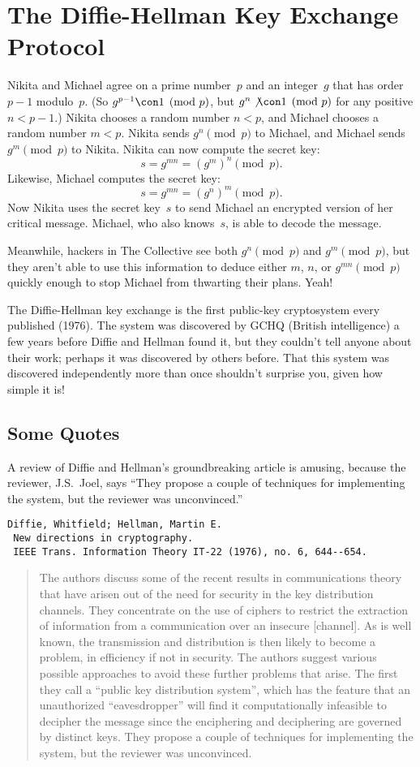 \documentclass[11pt]{report}
\begin{document}
\section{The Diffie-Hellman Key Exchange Protocol}
Nikita and Michael agree on a prime number~$p$ and
an integer~$g$ that has order $p-1$ modulo~$p$.
(So $g^{p-1}\con 1\pmod{p}$, but $g^{n} \not\con 1\pmod{p}$
for any positive $n<p-1$.)  Nikita chooses a random number
$n<p$, and Michael chooses a random number $m<p$.
Nikita sends $g^n\pmod{p}$ to Michael, and Michael
sends $g^m\pmod{p}$ to Nikita.
Nikita can now compute the secret key:
$$
  s = g^{mn} = (g^m)^n \pmod{p}.
$$
Likewise, Michael computes the secret key:
$$
  s = g^{mn} = (g^n)^m \pmod{p}.
$$
Now Nikita uses the secret key~$s$ to send Michael
an encrypted version of her critical message.  Michael,
who also knows~$s$, is able to decode the message.

Meanwhile, hackers in The Collective see both $g^n\pmod{p}$ and
$g^m\pmod{p}$, but they aren't able to use this information to deduce
either $m$, $n$, or $g^{mn}\pmod{p}$ quickly enough to stop Michael
from thwarting their plans.   Yeah!

The Diffie-Hellman key exchange is the first public-key cryptosystem
every published (1976).  The system was discovered by GCHQ (British
intelligence) a few years before Diffie and Hellman found it, but they
couldn't tell anyone about their work; perhaps it was discovered by
others before.  That this system was discovered independently more
than once shouldn't surprise you, given how simple it is!

\subsection{Some Quotes}
A review of Diffie and Hellman's groundbreaking article is amusing,
because the reviewer, J.S.\ Joel, says ``They propose a couple of
techniques for implementing the system, but the reviewer was
unconvinced.''
\begin{verbatim}
Diffie, Whitfield; Hellman, Martin E. 
 New directions in cryptography. 
 IEEE Trans. Information Theory IT-22 (1976), no. 6, 644--654. 
\end{verbatim}
\begin{quote}
  The authors discuss some of the recent results in communications
  theory that have arisen out of the need for security in the key
  distribution channels. They concentrate on the use of ciphers to
  restrict the extraction of information from a communication over an
  insecure [channel]. As is well known, the transmission and
  distribution is then likely to become a problem, in efficiency if not
  in security. The authors suggest various possible approaches to avoid
  these further problems that arise. The first they call a ``public key
  distribution system'', which has the feature that an unauthorized
  ``eavesdropper'' will find it computationally infeasible to decipher
  the message since the enciphering and deciphering are governed by
  distinct keys. They propose a couple of techniques for implementing
  the system, but the reviewer was unconvinced.
\end{quote}
\end{document}
